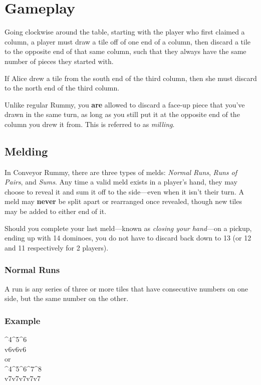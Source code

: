 \section{Gameplay}
Going clockwise around the table, starting with the player who first claimed a column, a player must draw a tile off of one end of a column, then discard a tile to the opposite end of that same column, such that they always have the same number of pieces they started with.

\example If Alice drew a tile from the south end of the third column, then she must discard to the north end of the third column.

\note Unlike regular Rummy, you \textbf{are} allowed to discard a face-up piece that you've drawn in the same turn, as long as you still put it at the opposite end of the column you drew it from. This is referred to as \textit{milling}.

\subsection{Melding}
In Conveyor Rummy, there are three types of melds: \textit{Normal Runs}, \textit{Runs of Pairs}, and \textit{Sums}.
Any time a valid meld exists in a player's hand, they may choose to reveal it and sum it off to the side---even when it isn't their turn.
A meld may \textbf{never} be split apart or rearranged once revealed, though new tiles may be added to either end of it.

Should you complete your last meld---known as \textit{closing your hand}---on a pickup, ending up with 14 dominoes, you do not have to discard back down to 13 (or 12 and 11 respectively for 2 players).

\subsubsection{Normal Runs}
A run is any series of three or more tiles that have consecutive numbers on one side, but the same number on the other.

\subsubsection*{Example}
{\domino ^4^5^6\\v6v6v6}\vspace{1mm}\\
\vspace{1mm}or\\
{\domino ^4^5^6^7^8\\v7v7v7v7v7}

